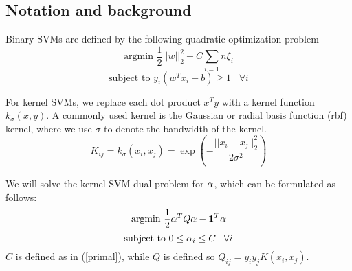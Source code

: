 \subsection{Notation and background}
Binary SVMs are defined by the following quadratic optimization problem 
\begin{equation}
	\text{argmin } \frac{1}{2} ||w||_2^2 + C \sum_{i=1}{n} \xi_i
	\label{primal}
\end{equation}
\begin{equation}
	\text{subject to } y_i(w^T x_i - b) \geq 1 \,\,\,\,\, \forall i
	\label{primal_constraint}
\end{equation}

For kernel SVMs, we replace each dot product $ x^T y $ with a kernel function $k_{\sigma}(x,y)$. 
A commonly used kernel is the Gaussian or radial basis function (rbf) kernel, where we use $\sigma$ to denote the bandwidth of the kernel.
\[
	K_{ij} = k_{\sigma}(x_i,x_j) = \exp \left(-\frac{||x_i - x_j||^2_2}{2 \sigma^2}\right)
\]

We will solve the kernel SVM dual problem for $\alpha$, which can be formulated as follows:
\begin{equation}
	\text{argmin } \frac{1}{2} \alpha^T Q \alpha - \boldsymbol{1}^T \alpha
	\label{dual}
\end{equation}
\begin{equation}
	\text{subject to } 0 \leq \alpha_i \leq C \,\,\,\,\, \forall i
	\label{dual_constraint}
\end{equation}
$C$ is defined as in (\ref{primal}), while $Q$ is defined so $Q_{ij} = y_i y_j K(x_i,x_j)$.

